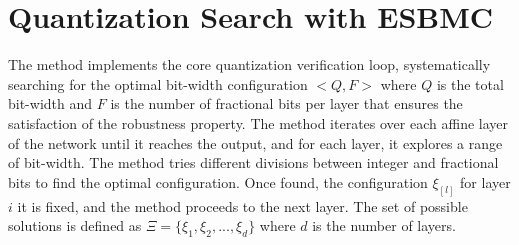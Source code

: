 \section{Quantization Search with ESBMC}

The method implements the core quantization verification loop, systematically searching for the optimal bit-width configuration $\mathcal <Q, F\mathcal>$ where  $Q$ is the total bit-width and $F$ is the number of fractional bits per layer that ensures the satisfaction of the robustness property.  The method iterates over each affine layer of the network until it reaches the output, and for each layer, it explores a range of bit-width. The method tries different divisions between integer and fractional bits to find the optimal configuration. Once found, the configuration $\xi _{[l]}$ for layer $i$ it is fixed, and the method proceeds to the next layer. The set of possible solutions is defined as $\varXi = {\{\xi _1, \xi _2, ..., \xi _{d}\}}$ where $d$ is the number of layers. 

